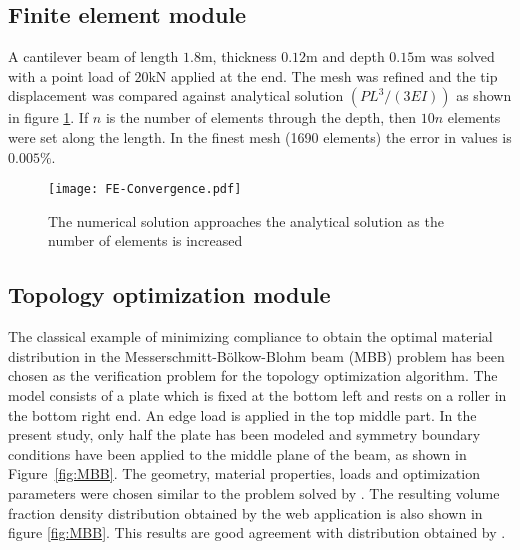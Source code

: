 \documentclass[preprint]{elsarticle}
\begin{document}
\begin{table}
\caption{Comparison of results between analytical and web application. Positive values denote tension and negative denotes compression.}
\label{tab:Verification1}
\centering
\small
{}
\normalsize
\end{table}


\subsection{Finite element module}\label{FEM}
A cantilever beam of length $1.8$m, thickness $0.12$m and depth $0.15$m was solved with a point load of $20$kN applied at the end. The mesh was refined and the tip displacement was compared against analytical solution $(PL^3/(3EI))$ as shown in figure \ref{fig:FEconvergence}. If $n$ is the number of elements through the depth, then $10n$ elements were set along the length. In the finest mesh (1690 elements) the error in values is $0.005\%$.

\begin{figure}[!h]
	\centering
	\texttt{[image: FE-Convergence.pdf]}
	\caption{The numerical solution approaches the analytical solution as the number of elements is increased}
	\label{fig:FEconvergence}
\end{figure}


\subsection{Topology optimization module} \label{TopoPlate}
The classical example of minimizing compliance to obtain the optimal
material distribution in the  Messerschmitt-B\"{o}lkow-Blohm beam (MBB) problem
has been chosen as the verification problem for the topology optimization algorithm. The model consists of a plate which is fixed at the bottom left and rests on a roller in the bottom right end. An edge load is applied in the top middle part. In the present study, only half the plate has been modeled and symmetry boundary conditions have been applied to the middle plane of the beam, as shown in
Figure~\ref{fig:MBB}. The geometry, material properties, loads and optimization
parameters were chosen similar to the problem solved by \citet{sigmund200199}. The resulting volume fraction density distribution
obtained by the web application is also shown in figure \ref{fig:MBB}. This
results are good agreement with distribution obtained by \citet{sigmund200199}.
\end{document}
